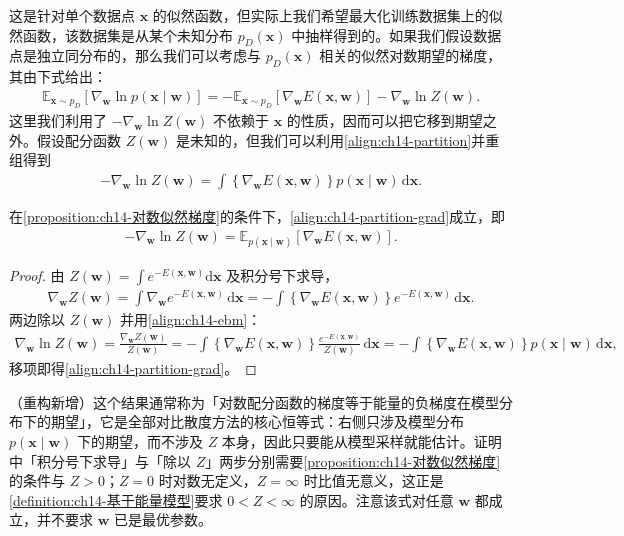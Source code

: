 \documentclass[../../main.tex]{subfiles}
\begin{document}
这是针对单个数据点 $\bm{x}$ 的似然函数，但实际上我们希望最大化训练数据集上的似然函数，该数据集是从某个未知分布 $p_{D}(\bm{x})$ 中抽样得到的。如果我们假设数据点是独立同分布的，那么我们可以考虑与 $p_{D}(\bm{x})$ 相关的似然对数期望的梯度，其由下式给出：
\begin{align}
\mathbb{E}_{\bm{x}\sim p_{D}}\left[\nabla_{\bm{w}}\ln p(\bm{x}\mid\bm{w})\right]=-\mathbb{E}_{\bm{x}\sim p_{D}}\left[\nabla_{\bm{w}}E(\bm{x},\bm{w})\right]-\nabla_{\bm{w}}\ln Z(\bm{w}).
\label{align:ch14-grad-expected}
\end{align}
这里我们利用了 $-\nabla_{\bm{w}}\ln Z(\bm{w})$ 不依赖于 $\bm{x}$ 的性质，因而可以把它移到期望之外。假设配分函数 $Z(\bm{w})$ 是未知的，但我们可以利用\eqref{align:ch14-partition}并重组得到
\begin{align}
-\nabla_{\bm{w}}\ln Z(\bm{w})=\int\left\{\nabla_{\bm{w}}E(\bm{x},\bm{w})\right\}p(\bm{x}\mid\bm{w})\,\mathrm{d}\bm{x}.
\label{align:ch14-partition-grad}
\end{align}

\begin{proposition}[配分函数对数的梯度]\label{proposition:ch14-配分函数梯度}
在\cref{proposition:ch14-对数似然梯度}的条件下，\eqref{align:ch14-partition-grad}成立，即
\begin{align*}
-\nabla_{\bm{w}}\ln Z(\bm{w})=\mathbb{E}_{p(\bm{x}\mid\bm{w})}\left[\nabla_{\bm{w}}E(\bm{x},\bm{w})\right].
\end{align*}
\end{proposition}

\begin{proof}
由 $Z(\bm{w})=\int e^{-E(\bm{x},\bm{w})}\mathrm{d}\bm{x}$ 及积分号下求导，
\begin{align*}
\nabla_{\bm{w}}Z(\bm{w})=\int\nabla_{\bm{w}}e^{-E(\bm{x},\bm{w})}\,\mathrm{d}\bm{x}=-\int\left\{\nabla_{\bm{w}}E(\bm{x},\bm{w})\right\}e^{-E(\bm{x},\bm{w})}\,\mathrm{d}\bm{x}.
\end{align*}
两边除以 $Z(\bm{w})$ 并用\eqref{align:ch14-ebm}：
\begin{align*}
\nabla_{\bm{w}}\ln Z(\bm{w})=\frac{\nabla_{\bm{w}}Z(\bm{w})}{Z(\bm{w})}=-\int\left\{\nabla_{\bm{w}}E(\bm{x},\bm{w})\right\}\frac{e^{-E(\bm{x},\bm{w})}}{Z(\bm{w})}\,\mathrm{d}\bm{x}=-\int\left\{\nabla_{\bm{w}}E(\bm{x},\bm{w})\right\}p(\bm{x}\mid\bm{w})\,\mathrm{d}\bm{x},
\end{align*}
移项即得\eqref{align:ch14-partition-grad}。
\end{proof}

\begin{remark}（重构新增）这个结果通常称为「对数配分函数的梯度等于能量的负梯度在模型分布下的期望」，它是全部对比散度方法的核心恒等式：右侧只涉及模型分布 $p(\bm{x}\mid\bm{w})$ 下的期望，而不涉及 $Z$ 本身，因此只要能从模型采样就能估计。证明中「积分号下求导」与「除以 $Z$」两步分别需要\cref{proposition:ch14-对数似然梯度}的条件与 $Z>0$；$Z=0$ 时对数无定义，$Z=\infty$ 时比值无意义，这正是\cref{definition:ch14-基于能量模型}要求 $0<Z<\infty$ 的原因。注意该式对任意 $\bm{w}$ 都成立，并不要求 $\bm{w}$ 已是最优参数。
\end{remark}
\end{document}
